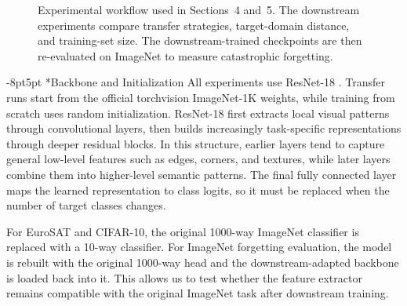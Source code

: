 \documentclass[10pt,twocolumn,letterpaper]{article}
\makeatletter
\def\cvprsubsection{\@startsection {subsection}{2}{\z@}
   {-8pt}{5pt} {\normalsize\bfseries}}
\def\cvprssubsect#1{\cvprsubsection*{#1}}
\def\cvprsubsect#1{\cvprsubsection{\texorpdfstring{\hskip -1em.~}{}#1}}
\def\subsection{\@ifstar\cvprssubsect\cvprsubsect}
\makeatother
\begin{document}
{\begin{figure}[!htbp]
{%
}
\caption{Experimental workflow used in Sections~4 and~5. The downstream experiments compare transfer strategies, target-domain distance, and training-set size. The downstream-trained checkpoints are then re-evaluated on ImageNet to measure catastrophic forgetting.}
\label{fig:pipeline}
\vspace{0.15em}
\end{figure}
}

\subsection{Backbone and Initialization}
All experiments use ResNet-18 \cite{he2016}. Transfer runs start from the official torchvision ImageNet-1K weights, while training from scratch uses random initialization. ResNet-18 first extracts local visual patterns through convolutional layers, then builds increasingly task-specific representations through deeper residual blocks. In this structure, earlier layers tend to capture general low-level features such as edges, corners, and textures, while later layers combine them into higher-level semantic patterns. The final fully connected layer maps the learned representation to class logits, so it must be replaced when the number of target classes changes.

For EuroSAT and CIFAR-10, the original 1000-way ImageNet classifier is replaced with a 10-way classifier. For ImageNet forgetting evaluation, the model is rebuilt with the original 1000-way head and the downstream-adapted backbone is loaded back into it. This allows us to test whether the feature extractor remains compatible with the original ImageNet task after downstream training.
\end{document}
